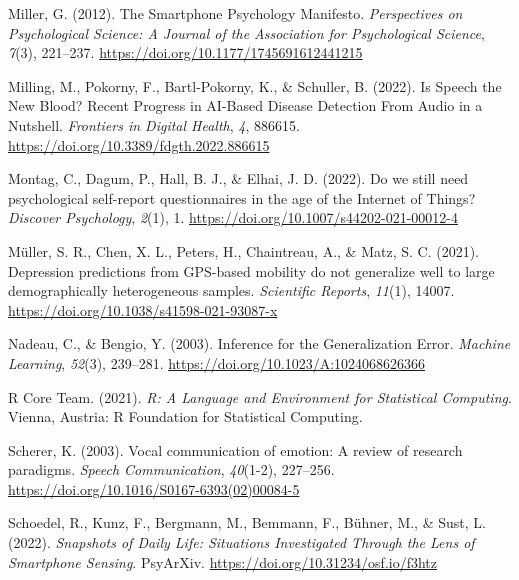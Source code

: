 \documentclass[
  english,
  man,floatsintext]{apa6}
\newlength{\cslhangindent}
\newenvironment{CSLReferences}[2] %
 {%
  \setlength{\parindent}{0pt}
  \ifodd #1 \everypar{\setlength{\hangindent}{\cslhangindent}}\ignorespaces\fi
  \ifnum #2 > 0
  \setlength{\parskip}{#2\baselineskip}
  \fi
 }%
 {}
\begin{document}
\begin{CSLReferences}{1}{0}
\leavevmode{}%
Miller, G. (2012). The {Smartphone Psychology Manifesto}. \emph{Perspectives on Psychological Science: A Journal of the Association for Psychological Science}, \emph{7}(3), 221--237. \url{https://doi.org/10.1177/1745691612441215}

\leavevmode{}%
Milling, M., Pokorny, F., Bartl-Pokorny, K., \& Schuller, B. (2022). Is {Speech} the {New Blood}? {Recent Progress} in {AI-Based Disease Detection From Audio} in a {Nutshell}. \emph{Frontiers in Digital Health}, \emph{4}, 886615. \url{https://doi.org/10.3389/fdgth.2022.886615}

\leavevmode{}%
Montag, C., Dagum, P., Hall, B. J., \& Elhai, J. D. (2022). Do we still need psychological self-report questionnaires in the age of the {Internet} of {Things}? \emph{Discover Psychology}, \emph{2}(1), 1. \url{https://doi.org/10.1007/s44202-021-00012-4}

\leavevmode{}%
Müller, S. R., Chen, X. L., Peters, H., Chaintreau, A., \& Matz, S. C. (2021). Depression predictions from {GPS-based} mobility do not generalize well to large demographically heterogeneous samples. \emph{Scientific Reports}, \emph{11}(1), 14007. \url{https://doi.org/10.1038/s41598-021-93087-x}

\leavevmode{}%
Nadeau, C., \& Bengio, Y. (2003). Inference for the {Generalization Error}. \emph{Machine Learning}, \emph{52}(3), 239--281. \url{https://doi.org/10.1023/A:1024068626366}

\leavevmode{}%
R Core Team. (2021). \emph{R: {A Language} and {Environment} for {Statistical Computing}}. Vienna, Austria: R Foundation for Statistical Computing.

\leavevmode{}%
Scherer, K. (2003). Vocal communication of emotion: {A} review of research paradigms. \emph{Speech Communication}, \emph{40}(1-2), 227--256. \url{https://doi.org/10.1016/S0167-6393(02)00084-5}

\leavevmode{}%
Schoedel, R., Kunz, F., Bergmann, M., Bemmann, F., Bühner, M., \& Sust, L. (2022). \emph{Snapshots of {Daily Life}: {Situations Investigated Through} the {Lens} of {Smartphone Sensing}}. PsyArXiv. \url{https://doi.org/10.31234/osf.io/f3htz}


\end{CSLReferences}
\end{document}
